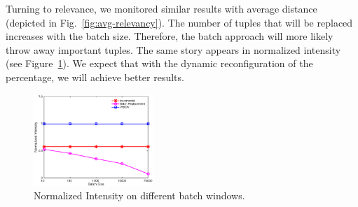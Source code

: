 Turning to relevance, we monitored similar results with
average distance (depicted in Fig.~\ref{fig:avg-relevancy}).
The number of tuples that will be replaced
increases with the batch size. Therefore, the batch approach
will more likely throw away important tuples.
The same story appears in normalized intensity (see Figure~\ref{fig:norm-intensity}).
We expect that with the dynamic reconfiguration of the
percentage, we will achieve better results.

\begin{figure}[!htb]
\centering
\includegraphics[width=0.4\textwidth,height=0.4\textheight,keepaspectratio]{Figures/NormalizedIntensity.eps}
\caption{Normalized Intensity on different batch windows.}
\label{fig:norm-intensity}
\end{figure}